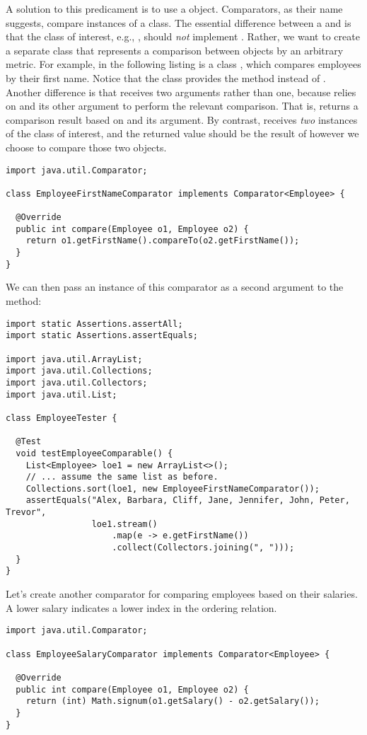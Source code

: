 A solution to this predicament is to use a  object. 
Comparators, as their name suggests, compare instances of a class. 
The essential difference between a  and  is that the class of interest, e.g., , should \emph{not} implement . 
Rather, we want to create a separate class that represents a comparison between  objects by an arbitrary metric. 
For example, in the following listing is a class , which compares employees by their first name. 
Notice that the  class provides the  method instead of . 
Another difference is that  receives two arguments rather than one, because  relies on  and its other argument to perform the relevant comparison. 
That is,  returns a comparison result based on  and its argument. 
By contrast,  receives \emph{two} instances of the class of interest, and the returned value should be the result of however we choose to compare those two objects.

\begin{lstlisting}[language=MyJava]
import java.util.Comparator;

class EmployeeFirstNameComparator implements Comparator<Employee> {

  @Override
  public int compare(Employee o1, Employee o2) {
    return o1.getFirstName().compareTo(o2.getFirstName());
  }
}
\end{lstlisting}

We can then pass an instance of this comparator as a second argument to the  method:

\begin{lstlisting}[language=MyJava]
import static Assertions.assertAll;
import static Assertions.assertEquals;

import java.util.ArrayList;
import java.util.Collections;
import java.util.Collectors;
import java.util.List;

class EmployeeTester {

  @Test
  void testEmployeeComparable() {
    List<Employee> loe1 = new ArrayList<>();
    // ... assume the same list as before.
    Collections.sort(loe1, new EmployeeFirstNameComparator());
    assertEquals("Alex, Barbara, Cliff, Jane, Jennifer, John, Peter, Trevor",
                 loe1.stream()
                     .map(e -> e.getFirstName())
                     .collect(Collectors.joining(", ")));
  }
}
\end{lstlisting}

Let's create another comparator for comparing employees based on their salaries. 
A lower salary indicates a lower index in the ordering relation.

\begin{lstlisting}[language=MyJava]
import java.util.Comparator;

class EmployeeSalaryComparator implements Comparator<Employee> {

  @Override
  public int compare(Employee o1, Employee o2) {
    return (int) Math.signum(o1.getSalary() - o2.getSalary());
  }
}
\end{lstlisting}
